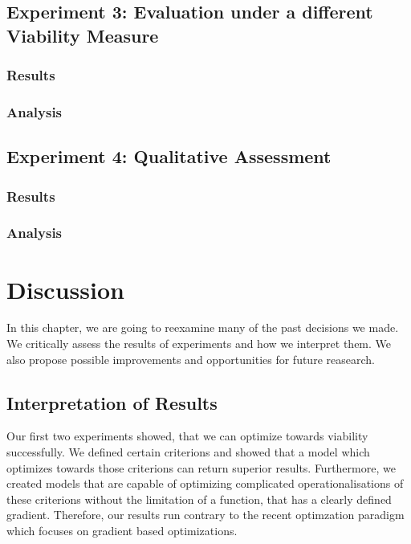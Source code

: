 \documentclass[12pt,a4paper]{report}
\begin{document}
\section{Experiment 3: Evaluation under a different Viability Measure}
\subsection{Results}

\subsection{Analysis}


\section{Experiment 4: Qualitative Assessment}
\subsection{Results}

\subsection{Analysis}



\chapter{Discussion}
\label{ch:dicussion}
In this chapter, we are going to reexamine many of the past decisions we made. We critically assess the results of experiments and how we interpret them. We also propose possible improvements and opportunities for future reasearch.

\section{Interpretation of Results}
Our first two experiments showed, that we can optimize towards viability successfully. We defined certain criterions and showed that a model which optimizes towards those criterions can return superior results. Furthermore, we created models that are capable of optimizing complicated operationalisations of these criterions without the limitation of a function, that has a clearly defined gradient. Therefore, our results run contrary to the recent optimzation paradigm which focuses on gradient based optimizations. 
\end{document}
